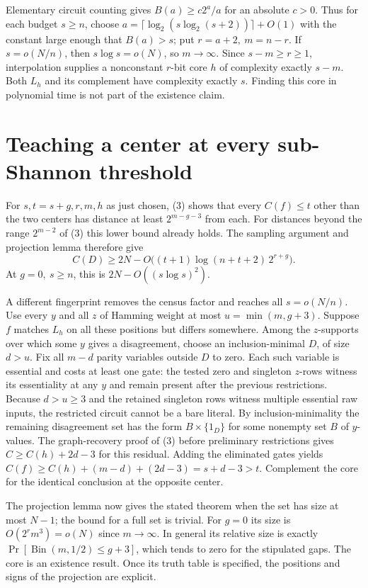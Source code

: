 \documentclass[11pt]{article}
\begin{document}
Elementary circuit counting gives \(B(a)\ge c2^a/a\) for an absolute \(c>0\). Thus for each budget \(s\ge n\), choose \(a=\lceil\log_2(s\log_2(s+2))\rceil+O(1)\) with the constant large enough that \(B(a)>s\); put \(r=a+2,\ m=n-r\). If \(s=o(N/n)\), then \(s\log s=o(N)\), so \(m\to\infty\). Since \(s-m\ge r\ge1\), interpolation supplies a nonconstant \(r\)-bit core \(h\) of complexity exactly \(s-m\). Both \(L_h\) and its complement have complexity exactly \(s\). Finding this core in polynomial time is not part of the existence claim.
\section{Teaching a center at every sub-Shannon threshold}
For \(s,t=s+g,r,m,h\) as just chosen, (3) shows that every \(C(f)\le t\) other than the two centers has distance at least \(2^{m-g-3}\) from each. For distances beyond the range \(2^{m-2}\) of (3) this lower bound already holds. The sampling argument and projection lemma therefore give
\[
 C(D)\ge 2N-O\big((t+1)\log(n+t+2)\,2^{r+g}\big).                 \tag{4}
\]
At \(g=0,\ s\ge n\), this is \(2N-O((s\log s)^2)\).

A different fingerprint removes the census factor and reaches all \(s=o(N/n)\). Use every \(y\) and all \(z\) of Hamming weight at most \(u=\min(m,g+3)\). Suppose \(f\) matches \(L_h\) on all these positions but differs somewhere. Among the \(z\)-supports over which some \(y\) gives a disagreement, choose an inclusion-minimal \(D\), of size \(d>u\). Fix all \(m-d\) parity variables outside \(D\) to zero. Each such variable is essential and costs at least one gate: the tested zero and singleton \(z\)-rows witness its essentiality at any \(y\) and remain present after the previous restrictions. Because \(d>u\ge3\) and the retained singleton rows witness multiple essential raw inputs, the restricted circuit cannot be a bare literal. By inclusion-minimality the remaining disagreement set has the form \(B\times\{1_D\}\) for some nonempty set \(B\) of \(y\)-values. The graph-recovery proof of (3) before preliminary restrictions gives \(C\ge C(h)+2d-3\) for this residual. Adding the eliminated gates yields \(C(f)\ge C(h)+(m-d)+(2d-3)=s+d-3>t\). Complement the core for the identical conclusion at the opposite center.


The projection lemma now gives the stated theorem when the set has size at most $N-1$; the bound for a full set is trivial. For $g=0$ its size is $O(2^r m^3)=o(N)$ since $m\to\infty$. In general its relative size is exactly $\Pr[\operatorname{Bin}(m,1/2)\le g+3]$, which tends to zero for the stipulated gaps. The core is an existence result. Once its truth table is specified, the positions and signs of the projection are explicit.
\end{document}

